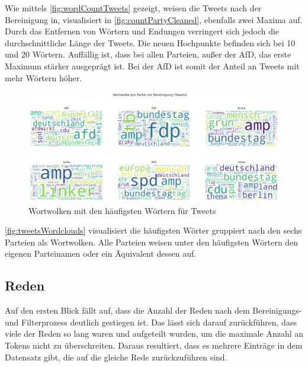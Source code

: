 
Wie mittels \autoref{fig:wordCountTweets} gezeigt, weisen die Tweets nach der Bereinigung in, visualisiert in \autoref{fig:countPartyCleaned}, ebenfalls zwei Maxima auf. Durch das Entfernen von Wörtern und Endungen verringert sich jedoch die durchschnittliche Länge der Tweets. Die neuen Hochpunkte befinden sich bei \num{10} und \num{20} Wörtern. Auffällig ist, dass bei allen Parteien, außer der \ac{AfD}, das erste Maximum stärker ausgeprägt ist. Bei der \ac{AfD} ist somit der Anteil an Tweets mit mehr Wörtern höher.

\begin{figure}[H]
    \centering
    \includegraphics[width=\linewidth]{data/images/tweets/wortwolke_pro_partei_vor_bereinigung.png}
    \caption{Wortwolken mit den häufigsten Wörtern für Tweets} \label{fig:tweetsWordclouds}
\end{figure}


\autoref{fig:tweetsWordclouds} visualisiert die häufigsten Wörter gruppiert nach den sechs Parteien als Wortwolken. Alle Parteien weisen unter den häufigsten Wörtern den eigenen Parteinamen oder ein Äquivalent dessen auf.

\subsection*{Reden}

Auf den ersten Blick fällt auf, dass die Anzahl der Reden nach dem Bereinigungs- und Filterprozess deutlich gestiegen ist. Das lässt sich darauf zurückführen, dass viele der Reden so lang waren und aufgeteilt wurden, um die maximale Anzahl an Tokens nicht zu überschreiten. Daraus resultiert, dass es mehrere Einträge in dem Datensatz gibt, die auf die gleiche Rede zurückzuführen sind.

